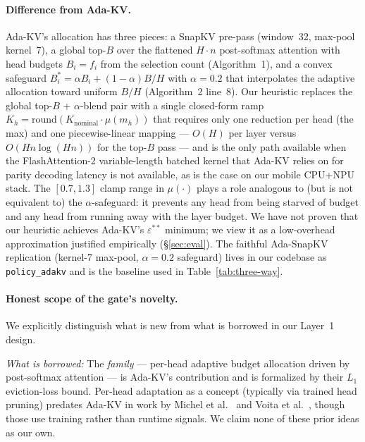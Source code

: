 \documentclass[sigconf, anonymous=false, screen=true]{acmart}
\begin{document}
\paragraph{Difference from Ada-KV.} Ada-KV's allocation has three pieces: a SnapKV pre-pass (window~32, max-pool kernel~7), a global top-$B$ over the flattened $H \cdot n$ post-softmax attention with head budgets $B_i = f_i$ from the selection count (Algorithm~1), and a convex safeguard $B_i^\ast = \alpha B_i + (1-\alpha) B/H$ with $\alpha = 0.2$ that interpolates the adaptive allocation toward uniform $B/H$ (Algorithm~2 line~8). Our heuristic replaces the global top-$B$ + $\alpha$-blend pair with a single closed-form ramp $K_h = \mathrm{round}(K_{\text{nominal}} \cdot \mu(m_h))$ that requires only one reduction per head (the max) and one piecewise-linear mapping --- $O(H)$ per layer versus $O(H n \log(Hn))$ for the top-$B$ pass --- and is the only path available when the FlashAttention-2 variable-length batched kernel that Ada-KV relies on for parity decoding latency is not available, as is the case on our mobile CPU+NPU stack. The $[0.7, 1.3]$ clamp range in $\mu(\cdot)$ plays a role analogous to (but is not equivalent to) the $\alpha$-safeguard: it prevents any head from being starved of budget and any head from running away with the layer budget. We have not proven that our heuristic achieves Ada-KV's $\varepsilon^{\ast\ast}$ minimum; we view it as a low-overhead approximation justified empirically (\S\ref{sec:eval}). The faithful Ada-SnapKV replication (kernel-7 max-pool, $\alpha{=}0.2$ safeguard) lives in our codebase as \texttt{policy\_adakv} and is the baseline used in Table~\ref{tab:three-way}.

\paragraph{Honest scope of the gate's novelty.} We explicitly distinguish what is new from what is borrowed in our Layer~1 design.

\noindent\emph{What is borrowed:} The \emph{family} --- per-head adaptive budget allocation driven by post-softmax attention --- is Ada-KV's contribution and is formalized by their $L_1$ eviction-loss bound. Per-head adaptation as a concept (typically via trained head pruning) predates Ada-KV in work by Michel et al.~\cite{michel2019sixteen} and Voita et al.~\cite{voita2019analyzing}, though those use training rather than runtime signals. We claim none of these prior ideas as our own.
\end{document}
